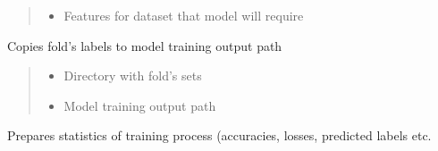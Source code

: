 \documentclass[letterpaper,10pt,english]{sphinxmanual}
\begin{document}
\begin{fulllineitems}
\begin{fulllineitems}
\begin{quote}
\begin{description}
\begin{itemize}
\item {} 
\sphinxAtStartPar
{} \textendash{} Features for dataset that model will require

\end{itemize}

\end{description}\end{quote}

\end{fulllineitems}


\begin{fulllineitems}
\label{\detokenize{net:net.UVANEMO.__prepare_output_models}}
\pysigstartsignatures
{}
\pysigstopsignatures
\sphinxAtStartPar
Copies fold’s labels to model training output path
\begin{quote}\begin{description}
\begin{itemize}
\item {} 
\sphinxAtStartPar
{} \textendash{} Directory with fold’s sets

\item {} 
\sphinxAtStartPar
{} \textendash{} Model training output path

\end{itemize}

\end{description}\end{quote}

\end{fulllineitems}


\begin{fulllineitems}
\label{\detokenize{net:net.UVANEMO.__prepare_training_statistics}}
\pysigstartsignatures
{}
\pysigstopsignatures
\sphinxAtStartPar
Prepares statistics of training process (accuracies, losses, predicted labels etc.


\end{fulllineitems}
\end{fulllineitems}
\end{document}
